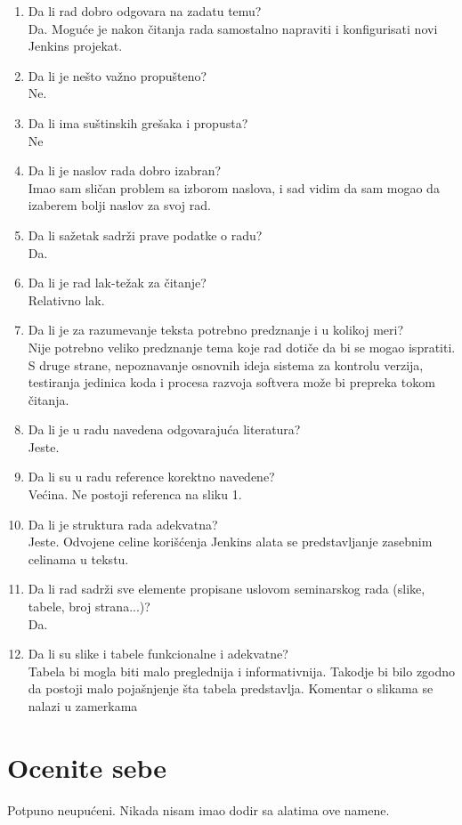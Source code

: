 \documentclass[a4paper]{report}
\begin{document}
\begin{enumerate}
\item Da li rad dobro odgovara na zadatu temu?\\ Da. Moguće je nakon čitanja rada samostalno napraviti i konfigurisati novi Jenkins projekat.
\item Da li je nešto važno propušteno?\\ Ne.
\item Da li ima suštinskih grešaka i propusta?\\ Ne
\item Da li je naslov rada dobro izabran?\\ Imao sam sličan problem sa izborom naslova, i sad vidim da sam mogao da izaberem bolji naslov za svoj rad.
\item Da li sažetak sadrži prave podatke o radu?\\ Da.
\item Da li je rad lak-težak za čitanje?\\ Relativno lak. 
\item Da li je za razumevanje teksta potrebno predznanje i u kolikoj meri?\\ Nije potrebno veliko predznanje tema koje rad dotiče da bi se mogao ispratiti. S druge strane, nepoznavanje osnovnih ideja sistema za kontrolu verzija, testiranja jedinica koda i procesa razvoja softvera može bi prepreka tokom čitanja.
\item Da li je u radu navedena odgovarajuća literatura?\\ Jeste.
\item Da li su u radu reference korektno navedene?\\ Većina. Ne postoji referenca na sliku 1.
\item Da li je struktura rada adekvatna?\\ Jeste. Odvojene celine korišćenja Jenkins alata se predstavljanje zasebnim celinama u tekstu.
\item Da li rad sadrži sve elemente propisane uslovom seminarskog rada (slike, tabele, broj strana...)?\\ Da. 
\item Da li su slike i tabele funkcionalne i adekvatne?\\ Tabela bi mogla biti malo preglednija i informativnija. Takodje bi bilo zgodno da postoji malo pojašnjenje šta tabela predstavlja. Komentar o slikama se nalazi u zamerkama
\end{enumerate}

\section{Ocenite sebe}
Potpuno neupućeni.
Nikada nisam imao dodir sa alatima ove namene. 
\end{document}
